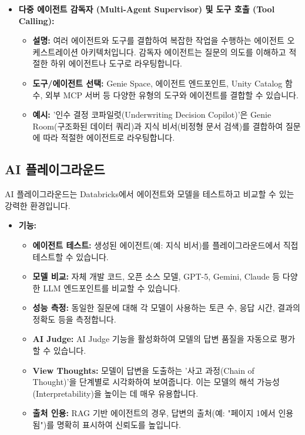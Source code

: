 \documentclass[11pt,a4paper]{article}
\begin{document}
\begin{itemize}
    \item \textbf{다중 에이전트 감독자 (Multi-Agent Supervisor) 및 도구 호출 (Tool Calling):}
    \begin{itemize}
        \item \textbf{설명:} 여러 에이전트와 도구를 결합하여 복잡한 작업을 수행하는 에이전트 오케스트레이션 아키텍처입니다. 감독자 에이전트는 질문의 의도를 이해하고 적절한 하위 에이전트나 도구로 라우팅합니다.
        \item \textbf{도구/에이전트 선택:} Genie Space, 에이전트 엔드포인트, Unity Catalog 함수, 외부 MCP 서버 등 다양한 유형의 도구와 에이전트를 결합할 수 있습니다.
        \item \textbf{예시:} '인수 결정 코파일럿(Underwriting Decision Copilot)'은 Genie Room(구조화된 데이터 쿼리)과 지식 비서(비정형 문서 검색)를 결합하여 질문에 따라 적절한 에이전트로 라우팅합니다.
    \end{itemize}
\end{itemize}

\subsection{AI 플레이그라운드}

AI 플레이그라운드는 Databricks에서 에이전트와 모델을 테스트하고 비교할 수 있는 강력한 환경입니다.

\begin{itemize}
    \item \textbf{기능:}
    \begin{itemize}
        \item \textbf{에이전트 테스트:} 생성된 에이전트(예: 지식 비서)를 플레이그라운드에서 직접 테스트할 수 있습니다.
        \item \textbf{모델 비교:} 자체 개발 코드, 오픈 소스 모델, GPT-5, Gemini, Claude 등 다양한 LLM 엔드포인트를 비교할 수 있습니다.
        \item \textbf{성능 측정:} 동일한 질문에 대해 각 모델이 사용하는 토큰 수, 응답 시간, 결과의 정확도 등을 측정합니다.
        \item \textbf{AI Judge:} AI Judge 기능을 활성화하여 모델의 답변 품질을 자동으로 평가할 수 있습니다.
        \item \textbf{View Thoughts:} 모델이 답변을 도출하는 '사고 과정(Chain of Thought)'을 단계별로 시각화하여 보여줍니다. 이는 모델의 해석 가능성(Interpretability)을 높이는 데 매우 유용합니다.
        \item \textbf{출처 인용:} RAG 기반 에이전트의 경우, 답변의 출처(예: "페이지 1에서 인용됨")를 명확히 표시하여 신뢰도를 높입니다.
    \end{itemize}
\end{itemize}
\end{document}
